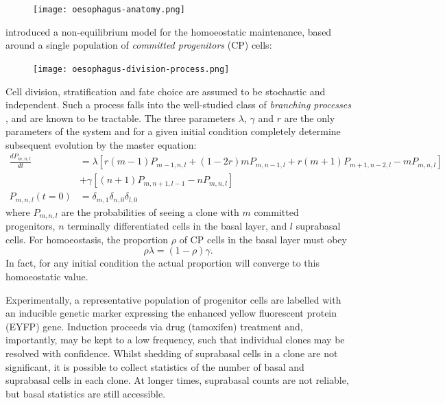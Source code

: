 \documentclass[10pt,english]{report}
\begin{document}
\begin{figure}[h]
	\centering
	\texttt{[image: oesophagus-anatomy.png]}
\end{figure}

\citet{klein07} introduced a non-equilibrium model for the homoeostatic maintenance, based around a single population of \emph{committed progenitors} (CP) cells:

\begin{figure}[h]
	\centering
	\texttt{[image: oesophagus-division-process.png]}
\end{figure}

Cell division, stratification and fate choice are assumed to be stochastic and independent. Such a process falls into the well-studied class of \emph{branching processes} \citep{athreya&ney}, and are known to be tractable. The three parameters $\lambda$, $\gamma$ and $r$ are the only parameters of the system and for a given initial condition completely determine subsequent evolution by the master equation:
\begin{align}
\nonumber
\frac{dP_{m,n,l}}{dt} &= \lambda\left[r (m-1)P_{m-1,n,l} + (1-2r)mP_{m,n-1,l} + r(m+1)P_{m+1,n-2,l} - mP_{m,n,l}\right] \\
                    &+ \gamma\left[(n+1)P_{m,n+1,l-1} - nP_{m,n,l}\right] \label{eq:ABC-master} \\
\nonumber
P_{m,n,l}(t = 0) &= \delta_{m,1} \delta_{n,0} \delta_{l,0}
\end{align}
where $P_{m,n,l}$ are the probabilities of seeing a clone with $m$ committed progenitors, $n$ terminally differentiated cells in the basal layer, and $l$ suprabasal cells. For homoeostasis, the proportion $\rho$ of CP cells in the basal layer must obey
\begin{equation}
\rho \lambda = (1-\rho) \gamma.\label{eq:homoeostatic-rho}
\end{equation}
In fact, for any initial condition the actual proportion will converge to this homoeostatic value.

Experimentally, a representative population of progenitor cells are labelled with an inducible genetic marker expressing the enhanced yellow fluorescent protein (EYFP) gene. Induction proceeds via drug (tamoxifen) treatment and, importantly, may be kept to a low frequency, such that individual clones may be resolved with confidence. Whilst shedding of suprabasal cells in a clone are not significant, it is possible to collect statistics of the number of basal and suprabasal cells in each clone. At longer times, suprabasal counts are not reliable, but basal statistics are still accessible.
\end{document}
